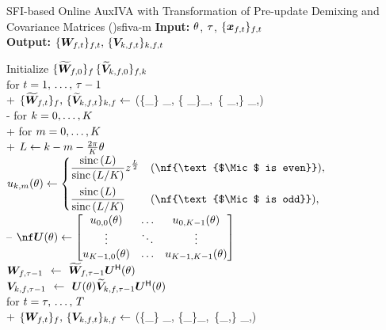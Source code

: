\documentclass[sip,biber]{now-journal}
\begin{document}
\begin{algorithm}{SFI-based Online AuxIVA with Transformation of Pre-update Demixing and Covariance Matrices (\SFIIVAm)}{sfiva-m}
  \textbf{Input:} $\theta$, $\tau$, $\{\Obs _{\ft}\} _{\ft}$ \\
  \textbf{Output:} $\{\Demix _{\ft}\}_{\ft},\, \{\cov _{\src,\ft}\}_{\src,\ft}$
  \begin{pseudo}
    Initialize $\{\widetilde{\bm{W}} _{f,0}\} _{f} \, \{\widetilde{\bm{V}} _{k,f,0}\} _{f,k}$ \\
    for $t = 1,\, \dots,\, \tau - 1$ \\+
      $\{\refpos{\Demix} _{\ft}\}_{\freq},\, \{\refpos{\cov} _{\src,\ft}\} _{\src,\freq} \gets$ (\{\Obs _{\ft}\} _{\freq}, \{ _{\ft[-1]}\}_{\freq},\, \{ _{\src,\ft[-1]}\} _{\src,\freq}) \\-
    for $k = 0, \dots, K$ \\+
      for $m = 0, \dots, K$ \\+
        $L \gets k - m - \frac{2\pi}{K} \theta$ \\
        $\rotmat _{\src,\mic}(\rotSpat) \gets
          \begin{cases}
            \displaystyle \frac{\sinc{(\rotIdx)}}{\sinc{\left(\rotIdx / \Mic\right)}} \twid ^{\frac{\rotIdx}{2}} & (\nf{\text{$\Mic$ is even}}),\\[1em]
            \displaystyle \frac{\sinc{(\rotIdx)}}{\sinc{\left(\rotIdx / \Mic\right)}} & (\nf{\text{$\Mic$ is odd}}),
          \end{cases}
        $ \ct{\eqref{eq:rot:sinc}} \\--
    $\nf\rotMat (\rotSpat) \gets
      \begin{bmatrix}
        \rotmat _{0, 0}(\rotSpat) & \dots & \rotmat _{0, \Mic - 1}(\rotSpat) \\
        \vdots & \ddots & \vdots \\
        \rotmat _{\Mic - 1, 0}(\rotSpat) & \dots & \rotmat _{\Mic - 1, \Mic - 1}(\rotSpat)
      \end{bmatrix}
      $ \ct{\eqref{eq:rotmat}} \\
    {$\bm{W} _{f,\tau - 1}$}    $\gets$ $\widetilde{\bm{W}} _{f,\tau - 1} \bm{U} ^{\mathsf{H}} (\theta)$ \ct{$(\forall \freq)$} \\
    {$\bm{V} _{k,f,\tau - 1}$} $\gets$ $\bm{U} (\theta) \widetilde{\bm{V}} _{k,f,\tau - 1} \bm{U} ^{\mathsf{H}} (\theta)$ \ct{$(\forall \src,\freq)$} \\
    for $t = \tau,\, \dots,\, T$ \\+
      $\{\Demix _{\ft}\}_{\freq},\, \{\cov _{\src,\ft}\} _{\src,\freq} \gets$ (\{\Obs _{\ft}\} _{\freq}, \{\Demix _{\ft[-1]}\}_{\freq},\, \{\cov _{\src,\ft[-1]}\} _{\src,\freq})
  \end{pseudo}
\end{algorithm}
\end{document}
